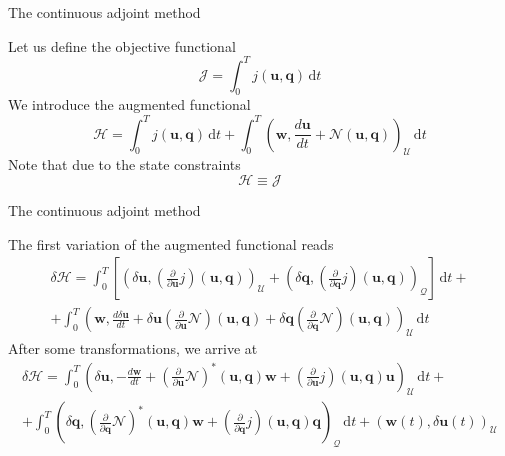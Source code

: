\documentclass{beamer}
\begin{document}
\begin{frame}{The continuous adjoint method}

	Let us define the objective functional
	\begin{equation}
		\mathcal{J}=\int_{0}^{T} j\left(\mathbf{u},\mathbf{q}\right)\,\mathrm{d}t
	\end{equation}
	We introduce the augmented functional
	\begin{equation}
		\mathcal{H}=\int_{0}^{T} j\left(\mathbf{u},\mathbf{q}\right)\,\mathrm{d}t+\int_{0}^{T}\left(\mathbf{w},\frac{d\mathbf{u}}{dt}+\mathbf{\mathcal{N}}\left(\mathbf{u},\mathbf{q}\right)\right)_{\mathscr{U}}\,\mathrm{d}t
	\end{equation}
	Note that due to the state constraints
	\begin{equation}
		\mathcal{H}\equiv\mathcal{J}
	\end{equation}
	
\end{frame}

\begin{frame}{The continuous adjoint method}

	The first variation of the augmented functional reads
	\begin{multline}
		\delta\mathcal{H}=\int_{0}^{T}\left[\left(\delta\mathbf{u},\left(\frac{\partial}{\partial\mathbf{u}} j\right)\left(\mathbf{u},\mathbf{q}\right)\right)_{\mathscr{U}}+\left(\delta\mathbf{q},\left(\frac{\partial}{\partial\mathbf{q}} j\right)\left(\mathbf{u},\mathbf{q}\right)\right)_{\mathscr{Q}}\right]\,\mathrm{d}t+\\+\int_{0}^{T}\left(\mathbf{w},\frac{d\delta\mathbf{u}}{dt}+\delta\mathbf{u}\left(\frac{\partial}{\partial\mathbf{u}}\mathbf{\mathcal{N}}\right)\left(\mathbf{u},\mathbf{q}\right)+\delta\mathbf{q}\left(\frac{\partial}{\partial\mathbf{q}}\mathbf{\mathcal{N}}\right)\left(\mathbf{u},\mathbf{q}\right)\right)_{\mathscr{U}}\,\mathrm{d}t
	\end{multline}
	After some transformations, we arrive at
	\begin{multline}
		\delta\mathcal{H}=\int_{0}^{T}\left(\delta\mathbf{u},-\frac{d\mathbf{w}}{dt}+\left(\frac{\partial}{\partial\mathbf{u}}\mathbf{\mathcal{N}}\right)^{*}\left(\mathbf{u},\mathbf{q}\right)\mathbf{w}+\left(\frac{\partial}{\partial\mathbf{u}} j\right)\left(\mathbf{u},\mathbf{q}\right)\mathbf{u}\right)_{\mathscr{U}}\,\mathrm{d}t+\\+\int_{0}^{T}\left(\delta\mathbf{q},\left(\frac{\partial}{\partial\mathbf{q}}\mathbf{\mathcal{N}}\right)^{*}\left(\mathbf{u},\mathbf{q}\right)\mathbf{w}+\left(\frac{\partial}{\partial\mathbf{q}} j\right)\left(\mathbf{u},\mathbf{q}\right)\mathbf{q}\right)_{\mathscr{Q}}\,\mathrm{d}t+\left(\mathbf{w}\left(t\right),\delta\mathbf{u}\left(t\right)\right)_{\mathscr{U}}
	\end{multline}

\end{frame}
\end{document}
